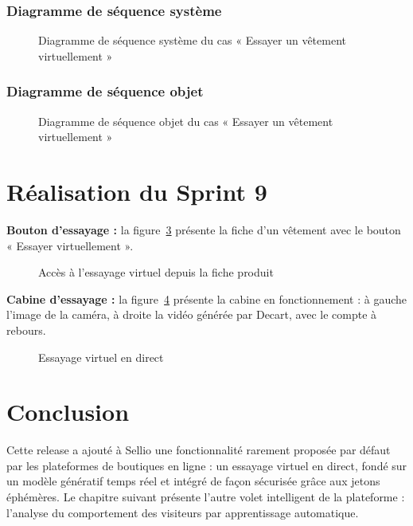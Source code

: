 \subsubsection{Diagramme de séquence système}
\begin{figure}[H]
    \centering
    \caption{Diagramme de séquence système du cas « Essayer un vêtement virtuellement »}
    \label{fig:dss-tryon}
\end{figure}

\subsubsection{Diagramme de séquence objet}
\begin{figure}[H]
    \centering
    \caption{Diagramme de séquence objet du cas « Essayer un vêtement virtuellement »}
    \label{fig:dso-tryon}
\end{figure}
\newpage
\section{Réalisation du Sprint 9}
\textbf{Bouton d'essayage :} la figure~\ref{fig:ui-tryon-btn} présente la fiche d'un vêtement avec le bouton « Essayer virtuellement ».
\begin{figure}[H]
    \centering
    \caption{Accès à l'essayage virtuel depuis la fiche produit}
    \label{fig:ui-tryon-btn}
\end{figure}

\textbf{Cabine d'essayage :} la figure~\ref{fig:ui-tryon} présente la cabine en fonctionnement : à gauche l'image de la caméra, à droite la vidéo générée par Decart, avec le compte à rebours.
\begin{figure}[H]
    \centering
    \caption{Essayage virtuel en direct}
    \label{fig:ui-tryon}
\end{figure}

\section*{Conclusion}
Cette release a ajouté à Sellio une fonctionnalité rarement proposée par défaut par les plateformes de boutiques en ligne : un essayage virtuel en direct, fondé sur un modèle génératif temps réel et intégré de façon sécurisée grâce aux jetons éphémères. Le chapitre suivant présente l'autre volet intelligent de la plateforme : l'analyse du comportement des visiteurs par apprentissage automatique.
